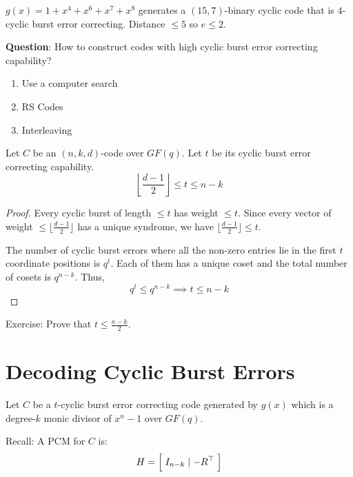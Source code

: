 \begin{exbox}
    \begin{example}
        $ g(x)=1+x^4+x^6+x^7+x^8 $ generates a $ (15,7) $-binary cyclic
        code that is $ 4 $-cyclic burst error correcting.
        Distance $ \leqslant 5 $ so $ e\leqslant 2 $.
    \end{example}
\end{exbox}

\textbf{Question}: How to construct codes with high cyclic burst error
correcting capability?
\begin{enumerate}[label=(\arabic*)]
    \item Use a computer search
    \item RS Codes
    \item Interleaving
\end{enumerate}

\begin{thmbox}
    \begin{theorem}
        Let $ C $ be an $ (n,k,d) $-code over $ GF(q) $. Let $ t $ be its
        cyclic burst error correcting capability.
        \[ \left\lfloor \frac{d-1}{2} \right\rfloor \leqslant t \leqslant n-k \]
    \end{theorem}
\end{thmbox}

\begin{proof}
    Every cyclic burst of length $ \leqslant t $ has weight $ \leqslant t $.
    Since every vector of weight $ \leqslant \lfloor \frac{d-1}{2} \rfloor $
    has a unique syndrome, we have $ \lfloor \frac{d-1}{2} \rfloor \leqslant t $.

    The number of cyclic burst errors where all the non-zero entries lie in the first
    $ t $ coordinate positions is $ q^t $. Each of them has a unique coset
    and the total number of cosets is $ q^{n-k} $. Thus,
    \[ q^t\leqslant q^{n-k}\implies t\leqslant n-k \]
\end{proof}

Exercise: Prove that $ t\leqslant \frac{n-k}{2} $.

\section{Decoding Cyclic Burst Errors}
Let $ C $ be a $ t $-cyclic burst error correcting code generated
by $ g(x) $ which is a degree-$ k $ monic divisor of $ x^n-1 $ over $ GF(q) $.

Recall: A PCM for $ C $ is:
\[ H= \Bigl[\; I_{n-k}\mid -R^\top \;\Bigr] \]

